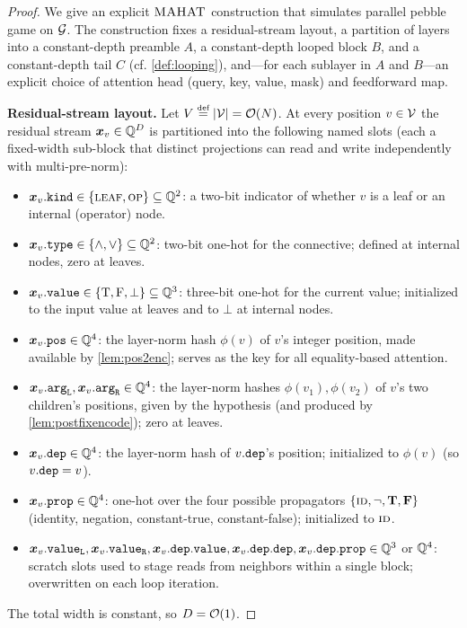 \documentclass{article}
\begin{document}
\begin{proof}\label{app:proofpebble}
    We give an explicit ${{\textsc{MAHAT}}}$ construction that simulates  parallel pebble game on ${ \mathcal{G}}$.
    The construction fixes a residual-stream layout, a partition of layers into a constant-depth preamble $A$, a constant-depth looped block $B$, and a constant-depth tail $C$ (cf. \cref{def:looping}), and---for each sublayer in $A$ and $B$---an explicit choice of attention head (query, key, value, mask) and feedforward map.
    
    \textbf{Residual-stream layout.}
    Let $V \defeq |\vertices| = \bigo(\idxn)$.
    At every position $v \in {\mathcal{V}}$ the residual stream ${{{ \bm{x}}}}_v \in {{ \mathbb{Q}}}^{{{ D}}}$ is partitioned into the following named slots (each a fixed-width sub-block that distinct projections can read and write independently with multi-pre-norm):
    \begin{itemize}[noitemsep,topsep=0pt,leftmargin=15pt,parsep=0pt,partopsep=0pt]
        \item ${{{ \bm{x}}}}_v.{\mathtt{kind}} \in {{\{ \textsc{leaf}, \textsc{op} \}}}\subseteq {{ \mathbb{Q}}}^2$: a two-bit indicator of whether $v$ is a leaf or an internal (operator) node.
        \item ${{{ \bm{x}}}}_v.{\mathtt{type}} \in {{\{ \land, \lor \}}}\subseteq {{ \mathbb{Q}}}^2$: two-bit one-hot for the connective; defined at internal nodes, zero at leaves.
        \item ${{{ \bm{x}}}}_v.{\mathtt{value}} \in {{\{ {\mathbin{\mathrm{T}}}, {\mathbin{\mathrm{F}}}, \bot \}}}\subseteq {{ \mathbb{Q}}}^3$: three-bit one-hot for the current value; initialized to the input value at leaves and to $\bot$ at internal nodes.
        \item ${{{ \bm{x}}}}_v.{\mathtt{pos}} \in {{ \mathbb{Q}}}^4$: the layer-norm hash $\phi(v)$ of $v$'s integer position, made available by \cref{lem:pos2enc}; serves as the key for all equality-based attention.
        \item ${{{ \bm{x}}}}_v.{\mathtt{arg}_\mathtt{L}}, {{{ \bm{x}}}}_v.{\mathtt{arg}_\mathtt{R}} \in {{ \mathbb{Q}}}^4$: the layer-norm hashes $\phi(v_1), \phi(v_2)$ of $v$'s two children's positions, given by the hypothesis (and produced by \cref{lem:postfixencode}); zero at leaves.
        \item ${{{ \bm{x}}}}_v.{\mathtt{dep}} \in {{ \mathbb{Q}}}^4$: the layer-norm hash of $v.{\mathtt{dep}}$'s position; initialized to $\phi(v)$ (so $v.{\mathtt{dep}} = v$).
        \item ${{{ \bm{x}}}}_v.{\mathtt{prop}} \in {{ \mathbb{Q}}}^4$: one-hot over the four possible propagators ${{\{ \textsc{id}, \neg, \mathbf{T}, \mathbf{F} \}}}$ (identity, negation, constant-true, constant-false); initialized to $\textsc{id}$.
        \item ${{{ \bm{x}}}}_v.{\mathtt{value}_\mathtt{L}}, {{{ \bm{x}}}}_v.{\mathtt{value}_\mathtt{R}}, {{{ \bm{x}}}}_v.{\mathtt{dep.value}}, {{{ \bm{x}}}}_v.{\mathtt{dep.dep}}, {{{ \bm{x}}}}_v.{\mathtt{dep.prop}} \in {{ \mathbb{Q}}}^3$ or ${{ \mathbb{Q}}}^4$: scratch slots used to stage reads from neighbors within a single block; overwritten on each loop iteration.
    \end{itemize}
    The total width is constant, so ${{ D}} = {{ \mathcal{O}}}(1)$.
    

\end{proof}
\end{document}
